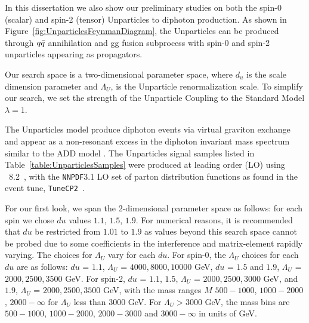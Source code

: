 In this dissertation we also show our preliminary studies on both the spin-0 (scalar) and spin-2 (tensor) Unparticles to diphoton production. As shown in Figure~\ref{fig:UnparticlesFeynmanDiagram}, the Unparticles can be produced through $q\Bar{q}$ annihilation and gg fusion subprocess with spin-0 and spin-2 unparticles appearing as propagators. 


Our search space is a two-dimensional parameter space, where $d_u$ is the scale dimension parameter and $\Lambda_{U}$, is the Unparticle renormalization scale. To simplify our search, we set the strength of the Unparticle Coupling to the Standard Model $\lambda = 1$. 

The Unparticles model produce diphoton events via virtual graviton exchange and appear as a non-resonant excess in the diphoton invariant mass spectrum similar to the ADD model \cite{Ask:2009pv}. The Unparticles signal samples listed in Table~\ref{table:UnparticlesSamples} were produced at leading order (LO) using \PYTHIA~8.2~\cite{Sjostrand:2008za},
with the \texttt{NNPDF}3.1 LO set of parton distribution functions as found in the event tune, \texttt{TuneCP2}~\cite{Sirunyan:2019dfx}.

For our first look, we span the 2-dimensional parameter space as follows: for each spin we chose $du$ values $1.1$, $1.5$, $1.9$. For numerical reasons\cite{KumarEtal:2008}, it is recommended that $du$ be restricted from $1.01$ to $1.9$ as values beyond this search space cannot be probed due to some coefficients in the interference and matrix-element rapidly varying. The choices for $\Lambda_U$ vary for each $du$. For spin-0, the $\Lambda_U$ choices for each $du$ are as follows: $du$ = $1.1$, $\Lambda_U$ = $4000, 8000, 10000$ GeV, $du$ = $1.5$ and $1.9$, $\Lambda_U$ = $2000, 2500, 3500$ GeV. For spin-2, $du$ = $1.1$, $1.5$, $\Lambda_U$ = $2000, 2500, 3000$ GeV, and $1.9$, $\Lambda_U$ = $2000, 2500, 3500$ GeV, with the mass ranges $M$ $500-1000$, $1000-2000$, $2000-\infty$ for $\Lambda_U$ less than $3000$ GeV. For $\Lambda_U > 3000$ GeV, the mass bins are $500-1000$, $1000-2000$, $2000-3000$ and $3000-\infty$ in units of GeV.

